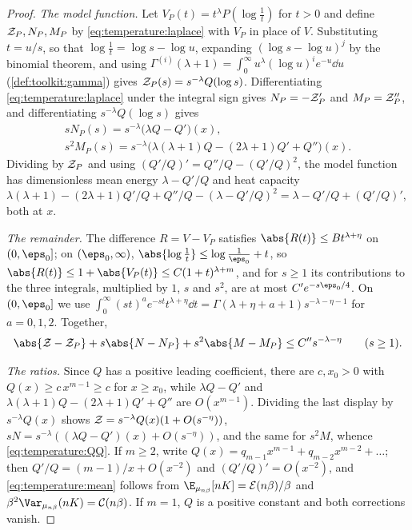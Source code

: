 \begin{refsection}
\begin{proof}
\emph{The model function.} Let $V_P(t)=t^\lambda P(\log\frac1t)$ for $t>0$ and define $\mathcal{Z}_P,N_P,M_P$ by \eqref{eq:temperature:laplace} with $V_P$ in place of $V$. Substituting $t=u/s$, so that $\log\frac1t=\log s-\log u$, expanding $(\log s-\log u)^j$ by the binomial theorem, and using $\Gamma^{(i)}(\lambda+1)=\int_0^\infty u^\lambda(\log u)^ie^{-u}\dd u$ (\cref{def:toolkit:gamma}) gives $\mathcal{Z}_P(s)=s^{-\lambda}Q(\log s)$. Differentiating \eqref{eq:temperature:laplace} under the integral sign gives $N_P=-\mathcal{Z}_P'$ and $M_P=\mathcal{Z}_P''$, and differentiating $s^{-\lambda}Q(\log s)$ gives
\begin{gather*}
sN_P(s)=s^{-\lambda}\bigl(\lambda Q-Q'\bigr)(x),\\
s^2M_P(s)=s^{-\lambda}\bigl(\lambda(\lambda+1)Q-(2\lambda+1)Q'+Q''\bigr)(x).
\end{gather*}
Dividing by $\mathcal{Z}_P$ and using $(Q'/Q)'=Q''/Q-(Q'/Q)^2$, the model function has dimensionless mean energy $\lambda-Q'/Q$ and heat capacity $\lambda(\lambda+1)-(2\lambda+1)Q'/Q+Q''/Q-(\lambda-Q'/Q)^2=\lambda-Q'/Q+(Q'/Q)'$, both at $x$.

\emph{The remainder.} The difference $R=V-V_P$ satisfies $\abs{R(t)}\le Bt^{\lambda+\eta}$ on $(0,\eps_0]$; on $(\eps_0,\infty)$, $\abs{\log\frac1t}\le\log\frac1{\eps_0}+t$, so $\abs{R(t)}\le1+\abs{V_P(t)}\le C(1+t)^{\lambda+m}$, and for $s\ge1$ its contributions to the three integrals, multiplied by $1$, $s$ and $s^2$, are at most $C'e^{-s\eps_0/4}$. On $(0,\eps_0]$ we use $\int_0^\infty(st)^ae^{-st}t^{\lambda+\eta}\dd t=\Gamma(\lambda+\eta+a+1)s^{-\lambda-\eta-1}$ for $a=0,1,2$. Together,
\[
\abs{\temperatureZ-\temperatureZ_P}+s\abs{N-N_P}+s^2\abs{M-M_P}\le C''s^{-\lambda-\eta}\qquad(s\ge1).
\]

\emph{The ratios.} Since $Q$ has a positive leading coefficient, there are $c,x_0>0$ with $Q(x)\ge c\,x^{m-1}\ge c$ for $x\ge x_0$, while $\lambda Q-Q'$ and $\lambda(\lambda+1)Q-(2\lambda+1)Q'+Q''$ are $O(x^{m-1})$. Dividing the last display by $s^{-\lambda}Q(x)$ shows $\mathcal{Z}=s^{-\lambda}Q(x)(1+O(s^{-\eta}))$, $sN=s^{-\lambda}((\lambda Q-Q')(x)+O(s^{-\eta}))$, and the same for $s^2M$, whence \eqref{eq:temperature:QQ}. If $m\ge2$, write $Q(x)=q_{m-1}x^{m-1}+q_{m-2}x^{m-2}+\dots$; then $Q'/Q=(m-1)/x+O(x^{-2})$ and $(Q'/Q)'=O(x^{-2})$, and \eqref{eq:temperature:mean} follows from $\E_{\mu_{n\beta}}[nK]=\temperatureE(n\beta)/\beta$ and $\beta^2\Var_{\mu_{n\beta}}(nK)=\temperatureC(n\beta)$. If $m=1$, $Q$ is a positive constant and both corrections vanish.
\end{proof}


\end{refsection}
